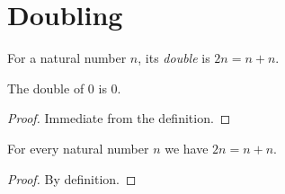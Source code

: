 \chapter{Doubling}
\label{chap:doubling}

\begin{definition}[Doubling]
  \label{def:twice}
  \leanok
  For a natural number $n$, its \emph{double} is $2n = n + n$.
\end{definition}

\begin{lemma}
  \label{lem:twice-zero}
  \leanok
  The double of $0$ is $0$.
\end{lemma}
\begin{proof}
  \leanok
  Immediate from the definition.
\end{proof}

\begin{theorem}
  \label{thm:twice-eq}
  \leanok
  For every natural number $n$ we have $2n = n + n$.
\end{theorem}
\begin{proof}
  \leanok
  By definition.
\end{proof}

